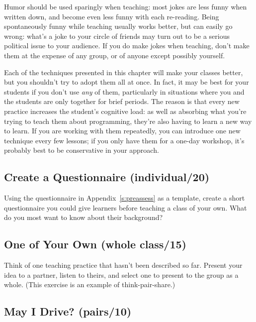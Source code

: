 Humor should be used sparingly when teaching: most jokes are less funny
when written down, and become even less funny with each re-reading.
Being spontaneously funny while teaching usually works better, but can
easily go wrong: what's a joke to your circle of friends may turn out to
be a serious political issue to your audience. If you do make jokes when
teaching, don't make them at the expense of any group, or of anyone
except possibly yourself.


Each of the techniques presented in this chapter will make your classes
better, but you shouldn't try to adopt them all at once. In fact, it may
be best for your students if you don't use \emph{any} of them, particularly
in situations where you and the students are only together for brief
periods. The reason is that every new practice increases the student's
cognitive load: as well as absorbing what you're trying to teach them
about programming, they're also having to learn a new way to learn. If
you are working with them repeatedly, you can introduce one new
technique every few lessons; if you only have them for a one-day
workshop, it's probably best to be conservative in your approach.


\subsection*{Create a Questionnaire (individual/20)}

Using the questionnaire in Appendix~\ref{s:preassess} as a template,
create a short questionnaire you could give learners before teaching a
class of your own. What do you most want to know about their background?

\subsection*{One of Your Own (whole class/15)}

Think of one teaching practice that hasn't been described so far.
Present your idea to a partner, listen to theirs, and select one to
present to the group as a whole. (This exercise is an example of
think-pair-share.)

\subsection*{May I Drive? (pairs/10)}

